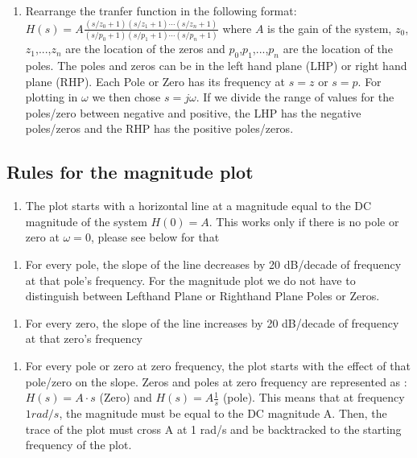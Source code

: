 \documentclass[11pt]{article}
\providecommand{\tightlist}{%
      \setlength{\itemsep}{0pt}\setlength{\parskip}{0pt}}
\begin{document}
\begin{enumerate}
\def\labelenumi{\arabic{enumi}.}
\tightlist
\item
  Rearrange the tranfer function in the following format:
  \(H(s) = A\frac{(s/z_0 + 1)(s/z_1 + 1)\cdots(s/z_n + 1)}{(s/p_0 + 1)(s/p_1 + 1)\cdots(s/p_n + 1)}\)
  where \(A\) is the gain of the system, \(z_0\),\(z_1\),...,\(z_n\) are
  the location of the zeros and \(p_0\),\(p_1\),...,\(p_n\) are the
  location of the poles. The poles and zeros can be in the left hand
  plane (LHP) or right hand plane (RHP). Each Pole or Zero has its
  frequency at \(s= z\) or \(s=p\). For plotting in \(\omega\) we then
  chose \(s=j\omega\). If we divide the range of values for the
  poles/zero between negative and positive, the LHP has the negative
  poles/zeros and the RHP has the positive poles/zeros.
\end{enumerate}

\subsection{Rules for the magnitude
plot}\label{rules-for-the-magnitude-plot}

\begin{enumerate}
\def\labelenumi{\arabic{enumi}.}
\setcounter{enumi}{1}
\tightlist
\item
  The plot starts with a horizontal line at a magnitude equal to the DC
  magnitude of the system \(H(0) = A\). This works only if there is no
  pole or zero at \(\omega = 0\), please see below for that
\end{enumerate}

\begin{enumerate}
\def\labelenumi{\arabic{enumi}.}
\setcounter{enumi}{2}
\tightlist
\item
  For every pole, the slope of the line decreases by 20 dB/decade of
  frequency at that pole's frequency. For the magnitude plot we do not
  have to distinguish between Lefthand Plane or Righthand Plane Poles or
  Zeros.
\end{enumerate}

\begin{enumerate}
\def\labelenumi{\arabic{enumi}.}
\setcounter{enumi}{3}
\tightlist
\item
  For every zero, the slope of the line increases by 20 dB/decade of
  frequency at that zero's frequency
\end{enumerate}

\begin{enumerate}
\def\labelenumi{\arabic{enumi}.}
\setcounter{enumi}{4}
\tightlist
\item
  For every pole or zero at zero frequency, the plot starts with the
  effect of that pole/zero on the slope. Zeros and poles at zero
  frequency are represented as : \(H(s) = A\cdot s\) (Zero) and
  \(H(s) = A \frac{1}{s}\) (pole). This means that at frequency
  \(1 rad/s\), the magnitude must be equal to the DC magnitude A. Then,
  the trace of the plot must cross A at 1 rad/s and be backtracked to
  the starting frequency of the plot.
\end{enumerate}
\end{document}
